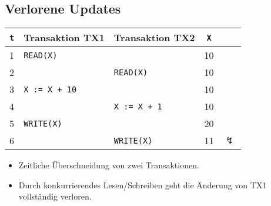         \subsection{Verlorene Updates} %
            \begin{table}[H]
            	\centering
            	\begin{tabular}{c | l | l | c c}
            		\textbf{\texttt{t}} & \textbf{Transaktion TX1} & \textbf{Transaktion TX2} & \textbf{\texttt{X}} &                \\ \hline
            		         1          & \texttt{READ(X)}         &                          & 10                  &                \\
            		         2          &                          & \texttt{READ(X)}         & 10                  &                \\
            		         3          & \texttt{X := X + 10}     &                          & 10                  &                \\
            		         4          &                          & \texttt{X := X + 1}      & 10                  &                \\
            		         5          & \texttt{WRITE(X)}        &                          & 20                  &                \\
            		         6          &                          & \texttt{WRITE(X)}        & 11                  & \(\lightning\)
            	\end{tabular}
            \end{table}
        
            \begin{itemize}
            	\item Zeitliche Überschneidung von zwei Transaktionen.
            	\item Durch konkurrierendes Lesen/Schreiben geht die Änderung von TX1 vollständig verloren.
            \end{itemize}

